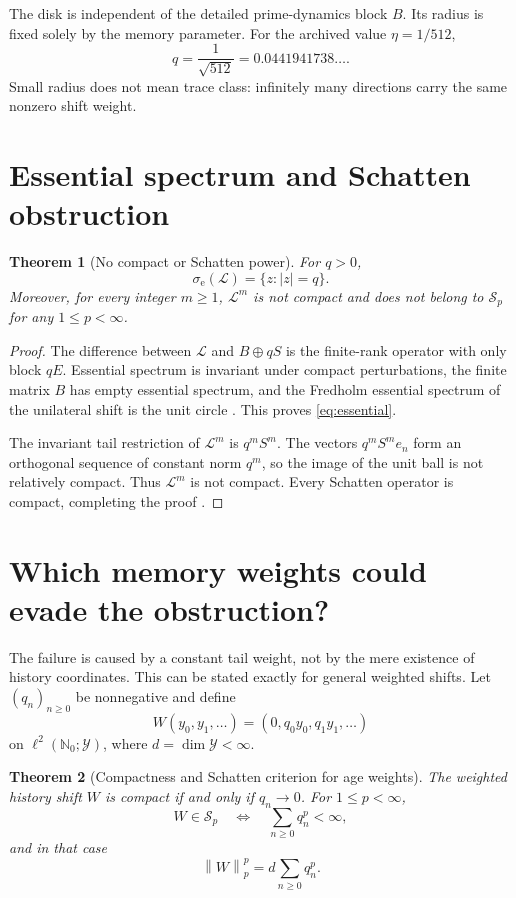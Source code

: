 \documentclass[12pt]{article}
\newtheorem{theorem}{Theorem}[section]
\theoremstyle{remark}
\newcommand{\cY}{\mathcal Y}
\newcommand{\cS}{\mathcal S}
\newcommand{\norm}[1]{\left\lVert#1\right\rVert}
\newcommand{\sigmae}{\sigma_{\mathrm e}}
\begin{document}
The disk is independent of the detailed prime-dynamics block $B$.  Its radius
is fixed solely by the memory parameter.  For the archived value
$\eta=1/512$,
\[
 q=\frac1{\sqrt{512}}=0.0441941738\ldots.
\]
Small radius does not mean trace class: infinitely many directions carry the
same nonzero shift weight.

\section{Essential spectrum and Schatten obstruction}

\begin{theorem}[No compact or Schatten power]\label{thm:schatten}
For $q>0$,
\begin{equation}\label{eq:essential}
 \sigmae(\mathcal L)=\{z:|z|=q\}.
\end{equation}
Moreover, for every integer $m\ge1$, $\mathcal L^m$ is not compact and does
not belong to $\cS_p$ for any $1\le p<\infty$.
\end{theorem}

\begin{proof}
The difference between $\mathcal L$ and $B\oplus qS$ is the finite-rank
operator with only block $qE$.  Essential spectrum is invariant under compact
perturbations, the finite matrix $B$ has empty essential spectrum, and the
Fredholm essential spectrum of the unilateral shift is the unit circle
\citep{Conway1990}.  This proves \eqref{eq:essential}.

The invariant tail restriction of $\mathcal L^m$ is $q^mS^m$.  The vectors
$q^mS^me_n$ form an orthogonal sequence of constant norm $q^m$, so the image
of the unit ball is not relatively compact.  Thus $\mathcal L^m$ is not
compact.  Every Schatten operator is compact, completing the proof
\citep{Simon2005}.
\end{proof}

\section{Which memory weights could evade the obstruction?}

The failure is caused by a constant tail weight, not by the mere existence of
history coordinates.  This can be stated exactly for general weighted shifts.
Let $(q_n)_{n\ge0}$ be nonnegative and define
\[
 W(y_0,y_1,\ldots)=(0,q_0y_0,q_1y_1,\ldots)
\]
on $\ell^2(\mathbb N_0;\cY)$, where $d=\dim\cY<\infty$.

\begin{theorem}[Compactness and Schatten criterion for age weights]
\label{thm:weighted}
The weighted history shift $W$ is compact if and only if $q_n\to0$.  For
$1\le p<\infty$,
\begin{equation}\label{eq:weighted-schatten}
 W\in\cS_p
 \quad\Longleftrightarrow\quad
 \sum_{n\ge0}q_n^p<\infty,
\end{equation}
and in that case
\begin{equation}\label{eq:weighted-norm}
 \norm{W}_p^p=d\sum_{n\ge0}q_n^p.
\end{equation}
\end{theorem}
\end{document}
